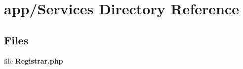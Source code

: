\section{app/\+Services Directory Reference}
\label{dir_8489919b303e42b892cd718b48982a3d}
\subsection*{Files}
\begin{DoxyCompactItemize}
\item 
file {\bf Registrar.\+php}
\end{DoxyCompactItemize}
